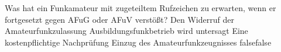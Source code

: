     {Was hat ein Funkamateur mit zugeteiltem Rufzeichen zu erwarten, wenn er fortgesetzt gegen AFuG oder AFuV verstößt?}
    {Den Widerruf der Amateurfunkzulassung}
    {Ausbildungsfunkbetrieb wird untersagt}
    {Eine kostenpflichtige Nachprüfung}
    {Einzug des Amateurfunkzeugnisses}
    {false}{false}